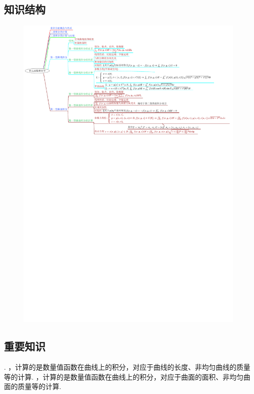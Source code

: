 \documentclass[12pt,UTF8]{ctexart}
\begin{document}
\subsection{知识结构}
\begin{figure}[H]
\begin{center}
\includegraphics[height=1\textheight,angle=0]{20190612.pdf}
\end{center}
\end{figure}
\subsection{重要知识}
\begin{enumerate}
.
，计算的是数量值函数在曲线上的积分，对应于曲线的长度、非均匀曲线的质量等的计算.
，计算的是数量值函数在曲线上的积分，对应于曲面的面积、非均匀曲面的质量等的计算.
\end{enumerate}
\end{document}
